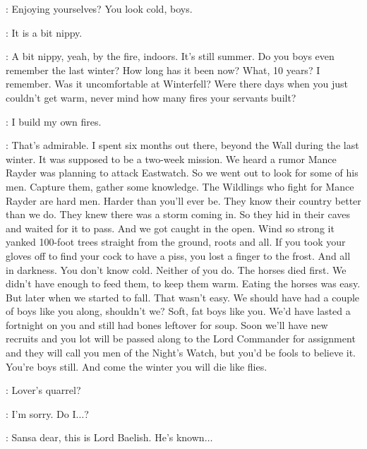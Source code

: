 
\ALLISER: Enjoying yourselves? You look cold, boys. 

\SAM: It is a bit nippy. 

\ALLISER: A bit nippy, yeah, by the fire, indoors. It's still summer. Do you boys even remember the last winter? How long has it been now? What, 10 years? I remember. Was it uncomfortable at Winterfell? Were there days when you just couldn't get warm, never mind how many fires your servants built? 

\JON: I build my own fires. 

\ALLISER: That's admirable. I spent six months out there, beyond the Wall during the last winter. It was supposed to be a two-week mission. We heard a rumor Mance Rayder was planning to attack Eastwatch. So we went out to look for some of his men. Capture them, gather some knowledge. The Wildlings who fight for Mance Rayder are hard men. Harder than you'll ever be. They know their country better than we do. They knew there was a storm coming in. So they hid in their caves and waited for it to pass. And we got caught in the open. Wind so strong it yanked 100-foot trees straight from the ground, roots and all. If you took your gloves off to find your cock to have a piss, you lost a finger to the frost. And all in darkness. You don't know cold. Neither of you do. The horses died first. We didn't have enough to feed them, to keep them warm. Eating the horses was easy. But later when we started to fall. That wasn't easy. We should have had a couple of boys like you along, shouldn't we? Soft, fat boys like you. We'd have lasted a fortnight on you and still had bones leftover for soup. Soon we'll have new recruits and you lot will be passed along to the Lord Commander for assignment and they will call you men of the Night's Watch, but you'd be fools to believe it. You're boys still. And come the winter you will die like flies. 

\scene



\LITTLEFINGER: Lover's quarrel? 

\SANSA: I'm sorry. Do I$\ldots$? 

\SEPTAMORDANE: Sansa dear, this is Lord Baelish. He's known$\ldots$ 

